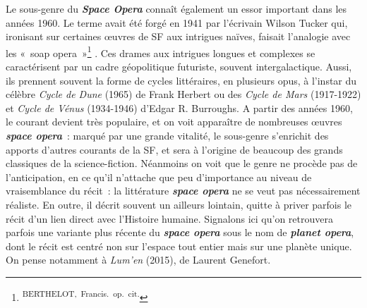 \documentclass[letterpaper,portrait,12pt]{article}
\begin{document}
	Le sous-genre du \textbf{\emph{Space Opera}} conna\^{i}t \'{e}galement un essor important dans les ann\'{e}es 1960. Le terme avait \'{e}t\'{e} forg\'{e} en 1941 par l'\'{e}crivain Wilson Tucker qui, ironisant sur certaines \oe{}uvres de SF aux intrigues naïves, faisait l'analogie avec les « soap opera »\footnote{\textsuperscript{\newpage
}\textsuperscript{	BERTHELOT,\ Francis.\ op.\ cit.}} . Ces drames aux intrigues longues et complexes se caract\'{e}risent par un cadre g\'{e}opolitique futuriste, souvent intergalactique. Aussi, ils prennent souvent la forme de cycles litt\'{e}raires, en plusieurs opus, \`{a} l'instar du c\'{e}l\`{e}bre \emph{Cycle de Dune} (1965) de Frank Herbert ou des \emph{Cycle de Mars} (1917-1922) et \emph{Cycle de V\'{e}nus} (1934-1946) d'Edgar R. Burroughs. A partir des ann\'{e}es 1960, le courant devient tr\`{e}s populaire, et on voit appara\^{i}tre de nombreuses \oe{}uvres \textbf{\emph{space opera}} : marqu\'{e} par une grande vitalit\'{e}, le sous-genre s'enrichit des apports d'autres courants de la SF, et sera \`{a} l'origine de beaucoup des grands classiques de la science-fiction. N\'{e}anmoins on voit que le genre ne proc\`{e}de pas de l'anticipation, en ce qu'il n'attache que peu d'importance au niveau de vraisemblance du r\'{e}cit : la litt\'{e}rature \textbf{\emph{space opera}} ne se veut pas n\'{e}cessairement r\'{e}aliste. En outre, il d\'{e}crit souvent un ailleurs lointain, quitte \`{a} priver parfois le r\'{e}cit d'un lien direct avec l'Histoire humaine. Signalons ici qu'on retrouvera parfois une variante plus r\'{e}cente du \textbf{\emph{space opera}} sous le nom de \textbf{\emph{planet opera}}, dont le r\'{e}cit est centr\'{e} non sur l'espace tout entier mais sur une plan\`{e}te unique. On pense notamment \`{a} \emph{Lum'en} (2015), de Laurent Genefort.
\end{document}

